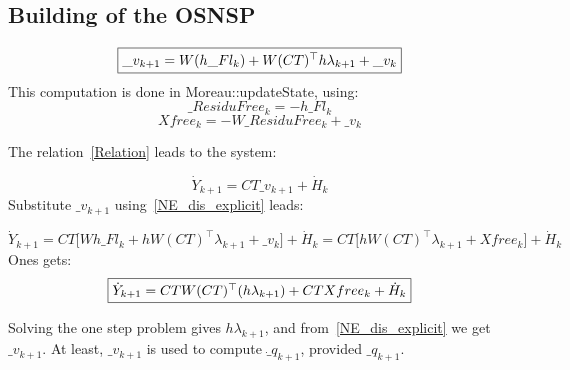 \subsection{Building of the OSNSP}

\begin{equation}
  \label{NE_dis_explicit}
  \fbox{$
   \_v_{k+1}=
   W (h \_Fl_k)+
   W (CT)^\top h\lambda _{k+1}+ \_v_k
   $}
  \end{equation}
  This computation is done in Moreau::updateState, using:
  \[\_ResiduFree_k = -h \_Fl_k\]
  \[Xfree_k = -W \_ResiduFree_k + \_v_k\]

The relation~\ref{Relation} leads to the system:

\[\dot Y _{k+1}= C T \_v_{k+1} + \dot H _{k} \]
Substitute $  \_v_{k+1} $ using~\ref{NE_dis_explicit} leads:

\[\dot Y _{k+1}= C T \lbrack W h\_Fl_k+
   hW(CT)^\top \lambda _{k+1}+ \_v_k \rbrack
   + \dot H _{k} = C T \lbrack  hW (CT)^\top \lambda _{k+1}+ Xfree_k \rbrack
   + \dot H _{k}\]
Ones gets:
\[\fbox{$
\dot Y _{k+1}= C T W (CT)^\top (h\lambda _{k+1}) + CT Xfree_k +\dot H _{k} $}\]


Solving the one step problem gives $h\lambda _{k+1}$, and from~\ref{NE_dis_explicit} we get
$ \_v_{k+1} $. At least, $ \_v_{k+1} $ is used to compute $\dot \_q_{k+1}$, provided $\_q_{k+1}$.

